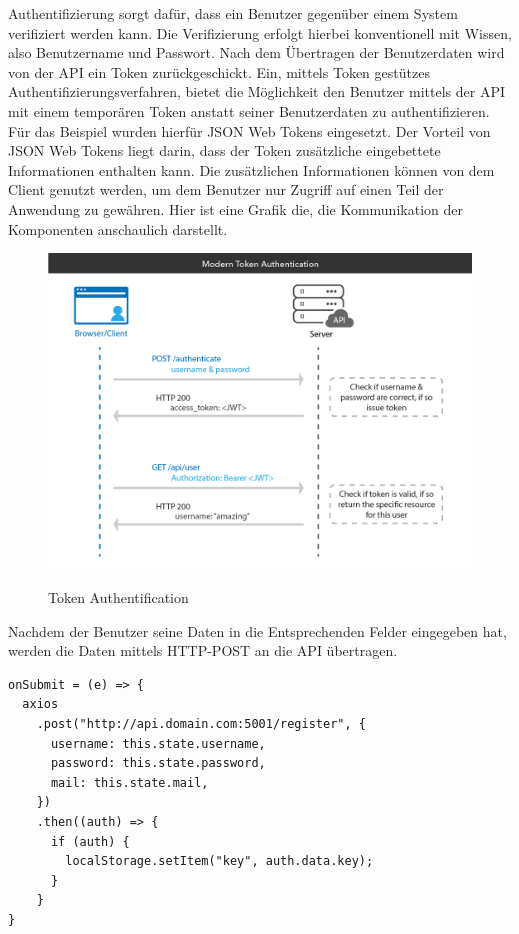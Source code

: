 \documentclass[utf8,biblatex]{lni}
\begin{document}
Authentifizierung sorgt dafür, dass ein Benutzer gegenüber einem System verifiziert werden kann.
Die Verifizierung erfolgt hierbei konventionell mit Wissen, also Benutzername und Passwort.
Nach dem Übertragen der Benutzerdaten wird von der API ein Token zurückgeschickt.
Ein, mittels Token gestützes Authentifizierungsverfahren, bietet die Möglichkeit den Benutzer mittels 
der API mit einem temporären Token anstatt seiner Benutzerdaten zu authentifizieren. 
Für das Beispiel wurden hierfür JSON Web Tokens \cite{o.V.2020} eingesetzt. 
Der Vorteil von JSON Web Tokens liegt darin, dass der Token zusätzliche eingebettete Informationen
enthalten kann. 
Die zusätzlichen Informationen können von dem Client genutzt werden, um dem Benutzer 
nur Zugriff auf einen Teil der Anwendung zu gewähren. 
Hier ist eine Grafik die, die Kommunikation der Komponenten anschaulich darstellt.
\newpage
\begin{figure}
  \centering
  \includegraphics[width=1\textwidth]{images/token-auth.png}
  \caption[Token Authentification]{Token Authentification} 
  \label{token-auth}
  \cite{Ngan.2019}
\end{figure} 

Nachdem der Benutzer seine Daten in die Entsprechenden Felder eingegeben hat, werden die Daten 
mittels HTTP-POST an die API übertragen.

\begin{verbatim}
onSubmit = (e) => {
  axios
    .post("http://api.domain.com:5001/register", {
      username: this.state.username,
      password: this.state.password,
      mail: this.state.mail,
    })
    .then((auth) => {
      if (auth) {
        localStorage.setItem("key", auth.data.key);
      }
    }
}
\end{verbatim}
\end{document}
